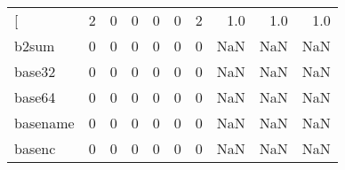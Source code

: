 \begin{longtable}{lrrrrrrrrr}
\bottomrule
\endlastfoot
{[}         &                                                  2 &                                                  0 &                                                  0 &                                                  0 &                                                  0 &                                                  2 &                                                1.0 &                                    1.0 &                                  1.0 \\
b2sum     &                                                  0 &                                                  0 &                                                  0 &                                                  0 &                                                  0 &                                                  0 &                                                NaN &                                    NaN &                                  NaN \\
base32    &                                                  0 &                                                  0 &                                                  0 &                                                  0 &                                                  0 &                                                  0 &                                                NaN &                                    NaN &                                  NaN \\
base64    &                                                  0 &                                                  0 &                                                  0 &                                                  0 &                                                  0 &                                                  0 &                                                NaN &                                    NaN &                                  NaN \\
basename  &                                                  0 &                                                  0 &                                                  0 &                                                  0 &                                                  0 &                                                  0 &                                                NaN &                                    NaN &                                  NaN \\
basenc    &                                                  0 &                                                  0 &                                                  0 &                                                  0 &                                                  0 &                                                  0 &                                                NaN &                                    NaN &                                  NaN \\

\end{longtable}
